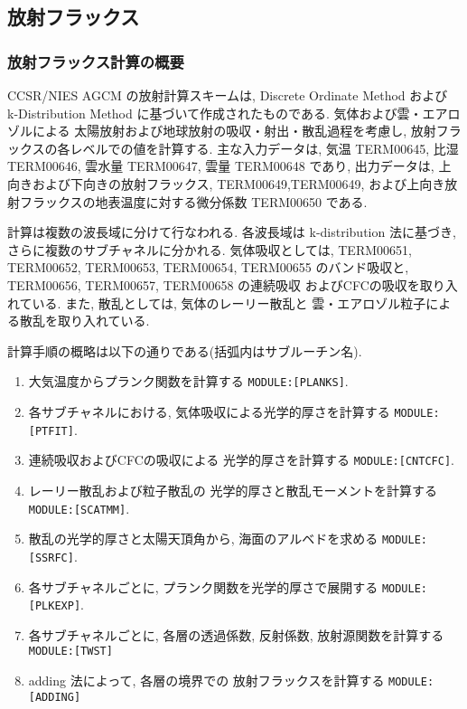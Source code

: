 ﻿\subsection{放射フラックス}

\subsubsection{放射フラックス計算の概要}

CCSR/NIES AGCM の放射計算スキームは, 
Discrete Ordinate Method および 
k-Distribution Method に基づいて作成されたものである.
気体および雲・エアロゾルによる
太陽放射および地球放射の吸収・射出・散乱過程を考慮し,
放射フラックスの各レベルでの値を計算する.
主な入力データは, 気温 TERM00645, 比湿 TERM00646, 雲水量 TERM00647, 雲量 TERM00648 であり,
出力データは, 上向きおよび下向きの放射フラックス, TERM00649,TERM00649,
および上向き放射フラックスの地表温度に対する微分係数
TERM00650 である.

計算は複数の波長域に分けて行なわれる.
各波長域は k-distribution 法に基づき,
さらに複数のサブチャネルに分かれる.
気体吸収としては, 
TERM00651, TERM00652, TERM00653, TERM00654, TERM00655 のバンド吸収と,
TERM00656, TERM00657, TERM00658 の連続吸収
およびCFCの吸収を取り入れている.
また, 散乱としては, 気体のレーリー散乱と
雲・エアロゾル粒子による散乱を取り入れている.

計算手順の概略は以下の通りである(括弧内はサブルーチン名).
%
\begin{enumerate}
\item 大気温度からプランク関数を計算する \texttt{MODULE:[PLANKS]}.
\item 各サブチャネルにおける,
      気体吸収による光学的厚さを計算する \texttt{MODULE:[PTFIT]}.
\item 連続吸収およびCFCの吸収による
      光学的厚さを計算する \texttt{MODULE:[CNTCFC]}.
\item レーリー散乱および粒子散乱の
      光学的厚さと散乱モーメントを計算する \texttt{MODULE:[SCATMM]}.
\item 散乱の光学的厚さと太陽天頂角から, 
      海面のアルベドを求める \texttt{MODULE:[SSRFC]}.
\item 各サブチャネルごとに,
      プランク関数を光学的厚さで展開する \texttt{MODULE:[PLKEXP]}.
\item 各サブチャネルごとに,
      各層の透過係数, 反射係数, 放射源関数を計算する \texttt{MODULE:[TWST]}
\item adding 法によって, 各層の境界での
      放射フラックスを計算する \texttt{MODULE:[ADDING]}
\end{enumerate}

